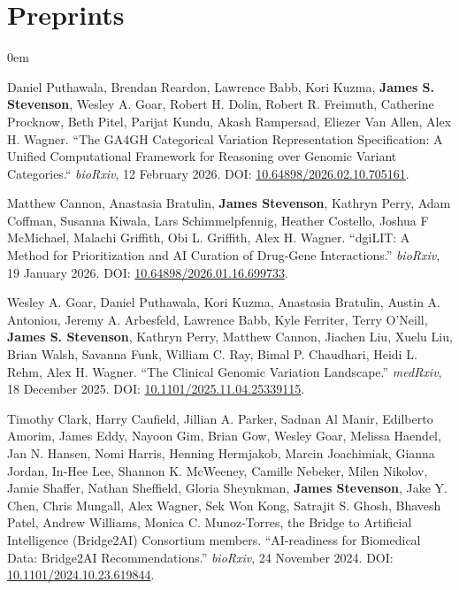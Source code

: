 \documentclass[letterpaper,11pt]{article}
\begin{document}
\section{Preprints}
\begin{addmargin}[1em]{0em}

    Daniel Puthawala, Brendan Reardon, Lawrence Babb, Kori Kuzma, \textbf{James S. Stevenson}, Wesley A. Goar, Robert H. Dolin, Robert R. Freimuth, Catherine Procknow, Beth Pitel, Parijat Kundu, Akash Rampersad, Eliezer Van Allen, Alex H. Wagner. ``The GA4GH Categorical Variation Representation Specification: A Unified Computational Framework for Reasoning over Genomic Variant Categories.`` \emph{bioRxiv}, 12 February 2026. DOI: \href{https://doi.org/10.64898/2026.02.10.705161}{10.64898/2026.02.10.705161}.

\vspace{8pt}\par

    Matthew Cannon, Anastasia Bratulin, \textbf{James Stevenson}, Kathryn Perry, Adam Coffman, Susanna Kiwala, Lars Schimmelpfennig, Heather Costello, Joshua F McMichael, Malachi Griffith, Obi L. Griffith, Alex H. Wagner. ``dgiLIT: A Method for Prioritization and AI Curation of Drug-Gene Interactions.'' \emph{bioRxiv}, 19 January 2026. DOI: \href{https://doi.org/10.64898/2026.01.16.699733}{10.64898/2026.01.16.699733}.

\vspace{8pt}\par

    Wesley A. Goar, Daniel Puthawala, Kori Kuzma, Anastasia Bratulin, Austin A. Antoniou, Jeremy A. Arbesfeld, Lawrence Babb, Kyle Ferriter, Terry O’Neill, \textbf{James S. Stevenson}, Kathryn Perry, Matthew Cannon, Jiachen Liu, Xuelu Liu, Brian Walsh, Savanna Funk, William C. Ray, Bimal P. Chaudhari, Heidi L. Rehm, Alex H. Wagner. ``The Clinical Genomic Variation Landscape.'' \emph{medRxiv}, 18 December 2025. DOI: \href{https://doi.org/10.1101/2025.11.04.25339115}{10.1101/2025.11.04.25339115}.


\vspace{8pt}\par

    Timothy Clark, Harry Caufield, Jillian A. Parker, Sadnan Al Manir, Edilberto Amorim, James Eddy, Nayoon Gim, Brian Gow, Wesley Goar, Melissa Haendel, Jan N. Hansen, Nomi Harris, Henning Hermjakob, Marcin Joachimiak, Gianna Jordan, In-Hee Lee, Shannon K. McWeeney, Camille Nebeker, Milen Nikolov, Jamie Shaffer, Nathan Sheffield, Gloria Sheynkman, \textbf{James Stevenson}, Jake Y. Chen, Chris Mungall, Alex Wagner, Sek Won Kong, Satrajit S. Ghosh, Bhavesh Patel, Andrew Williams, Monica C. Munoz-Torres, the Bridge to Artificial Intelligence (Bridge2AI) Consortium members. ``AI-readiness for Biomedical Data: Bridge2AI Recommendations.'' \emph{bioRxiv}, 24 November 2024. DOI: \href{https://doi.org/10.1101/2024.10.23.619844}{10.1101/2024.10.23.619844}.

\end{addmargin}
\end{document}
